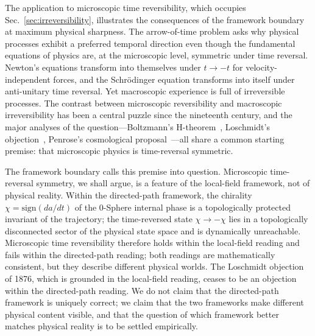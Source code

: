 \documentclass[%
 reprint, amsmath,amssymb, aps, prb, ]{revtex4-2}
\numberwithin{equation}{section}
\begin{document}
The application to microscopic time reversibility, which occupies Sec.~\ref{sec:irreversibility}, illustrates the consequences of the framework boundary at maximum physical sharpness. The arrow-of-time problem asks why physical processes exhibit a preferred temporal direction even though the fundamental equations of physics are, at the microscopic level, symmetric under time reversal. Newton's equations transform into themselves under $t\to -t$ for velocity-independent forces, and the Schr\"odinger equation transforms into itself under anti-unitary time reversal. Yet macroscopic experience is full of irreversible processes. The contrast between microscopic reversibility and macroscopic irreversibility has been a central puzzle since the nineteenth century, and the major analyses of the question---Boltzmann's H-theorem~\cite{Boltzmann1872}, Loschmidt's objection~\cite{Loschmidt1876}, Penrose's cosmological proposal~\cite{Penrose1989}---all share a common starting premise: that microscopic physics is time-reversal symmetric.

The framework boundary calls this premise into question. Microscopic time-reversal symmetry, we shall argue, is a feature of the local-field framework, not of physical reality. Within the directed-path framework, the chirality $\chi = \mathrm{sign}(da/dt)$ of the 0-Sphere internal phase is a topologically protected invariant of the trajectory; the time-reversed state $\chi \to -\chi$ lies in a topologically disconnected sector of the physical state space and is dynamically unreachable. Microscopic time reversibility therefore holds within the local-field reading and fails within the directed-path reading; both readings are mathematically consistent, but they describe different physical worlds. The Loschmidt objection of 1876, which is grounded in the local-field reading, ceases to be an objection within the directed-path reading. We do not claim that the directed-path framework is uniquely correct; we claim that the two frameworks make different physical content visible, and that the question of which framework better matches physical reality is to be settled empirically.
\end{document}
